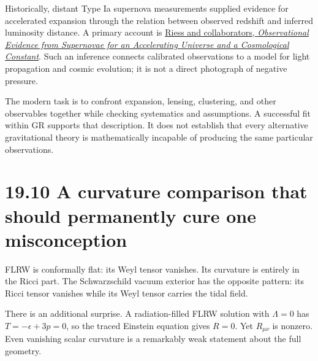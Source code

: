 \documentclass[
  11pt,
  letterpaper,
  oneside,
  openany]{scrbook}
\begin{document}
Historically, distant Type Ia supernova measurements supplied evidence
for accelerated expansion through the relation between observed redshift
and inferred luminosity distance. A primary account is
\href{https://arxiv.org/abs/astro-ph/9805201}{Riess and collaborators,
\emph{Observational Evidence from Supernovae for an Accelerating
Universe and a Cosmological Constant}}. Such an inference connects
calibrated observations to a model for light propagation and cosmic
evolution; it is not a direct photograph of negative pressure.

The modern task is to confront expansion, lensing, clustering, and other
observables together while checking systematics and assumptions. A
successful fit within GR supports that description. It does not
establish that every alternative gravitational theory is mathematically
incapable of producing the same particular observations.

\hypertarget{a-curvature-comparison-that-should-permanently-cure-one-misconception}{%
\section{19.10 A curvature comparison that should permanently cure one
misconception}\label{a-curvature-comparison-that-should-permanently-cure-one-misconception}}

FLRW is conformally flat: its Weyl tensor vanishes. Its curvature is
entirely in the Ricci part. The Schwarzschild vacuum exterior has the
opposite pattern: its Ricci tensor vanishes while its Weyl tensor
carries the tidal field.

There is an additional surprise. A radiation-filled FLRW solution with
\(\Lambda=0\) has \(T=-\epsilon+3p=0\), so the traced Einstein equation
gives \(R=0\). Yet \(R_{\mu\nu}\) is nonzero. Even vanishing scalar
curvature is a remarkably weak statement about the full geometry.

\begingroup\small\setlength{\tabcolsep}{5pt}\renewcommand{\arraystretch}{1.13}
\end{document}
